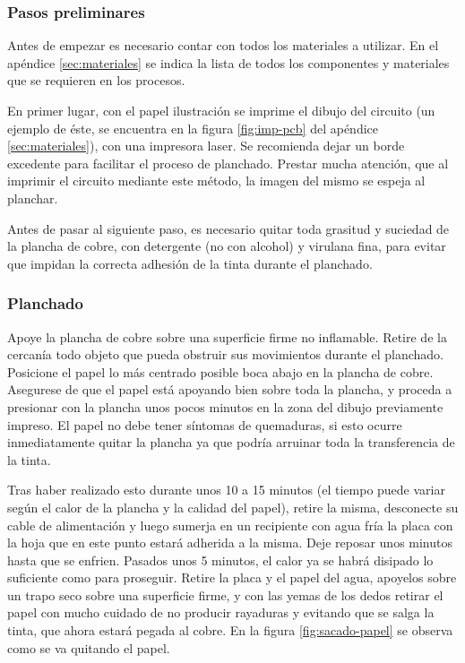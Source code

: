 \subsubsection{Pasos preliminares}
Antes de empezar es necesario contar con todos los materiales a utilizar. En el apéndice \ref{sec:materiales} se indica la lista de todos los componentes y materiales que se requieren en los procesos.

En primer lugar, con el papel ilustración se imprime el dibujo del circuito (un ejemplo de éste, se encuentra en la figura \ref{fig:imp-pcb} del apéndice \ref{sec:materiales}), con una impresora laser. Se recomienda dejar un borde excedente para facilitar el proceso de planchado. Prestar mucha atención, que al imprimir el circuito mediante este método, la imagen del mismo se espeja al planchar.

Antes de pasar al siguiente paso, es necesario quitar toda grasitud y suciedad de la plancha de cobre, con detergente (no con alcohol) y virulana fina, para evitar que impidan la correcta adhesión de la tinta durante el planchado.

\subsubsection{Planchado}
Apoye la plancha de cobre sobre una superficie firme no inflamable. Retire de la cercanía todo objeto que pueda obstruir sus movimientos durante el planchado. Posicione el papel lo más centrado posible boca abajo en la plancha de cobre. Asegurese de que el papel está apoyando bien sobre toda la plancha, y proceda a presionar con la plancha unos pocos minutos en la zona del dibujo previamente impreso. El papel no debe tener síntomas de quemaduras, si esto ocurre inmediatamente quitar la plancha ya que podría arruinar toda la transferencia de la tinta.

Tras haber realizado esto durante unos 10 a 15 minutos (el tiempo puede variar según el calor de la plancha y la calidad del papel), retire la misma, desconecte su cable de alimentación y luego sumerja en un recipiente con agua fría la placa con la hoja que en este punto estará adherida a la misma. Deje reposar unos minutos hasta que se enfrien. Pasados unos 5 minutos, el calor ya se habrá disipado lo suficiente como para proseguir. Retire la placa y el papel del agua, apoyelos sobre un trapo seco sobre una superficie firme, y con las yemas de los dedos retirar el papel con mucho cuidado de no producir rayaduras y evitando que se salga la tinta, que ahora estará pegada al cobre.
En la figura \ref{fig:sacado-papel} se observa como se va quitando el papel.

